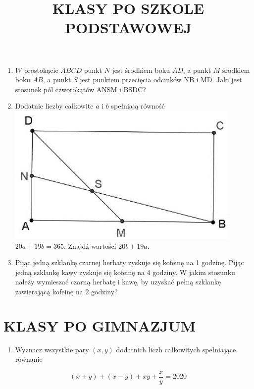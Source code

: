 \documentclass[10pt]{article}
\title{KLASY PO SZKOLE PODSTAWOWEJ }
\author{}
\date{}
\begin{document}
\maketitle
\begin{enumerate}
  \item \(W\) prostokącie \(A B C D\) punkt \(N\) jest środkiem boku \(A D\), a punkt \(M\) środkiem boku \(A B\), a punkt \(S\) jest punktem przecięcia odcinków NB i MD. Jaki jest stosunek pól czworokątów ANSM i BSDC?
  \item Dodatnie liczby całkowite \(a\) i \(b\) spełniają równość\\
\includegraphics[max width=\textwidth, center]{2024_11_21_453869ede2e906b091c4g-1(1)}\\
\(20 a+19 b=365\). Znajdź wartości \(20 b+19 a\).
  \item Pijąc jedną szklankę czarnej herbaty zyskuje się kofeinę na 1 godzinę. Pijąc jedną szklankę kawy zyskuje się kofeinę na 4 godziny. W jakim stosunku należy wymieszać czarną herbatę i kawę, by uzyskać pełną szklankę zawierającą kofeinę na 2 godziny?
\end{enumerate}

\section*{KLASY PO GIMNAZJUM}
\begin{enumerate}
  \item Wyznacz wszystkie pary \((x, y)\) dodatnich liczb całkowitych spełniające równanie
\end{enumerate}

\[
(x+y)+(x-y)+x y+\frac{x}{y}=2020
\]
\end{document}
